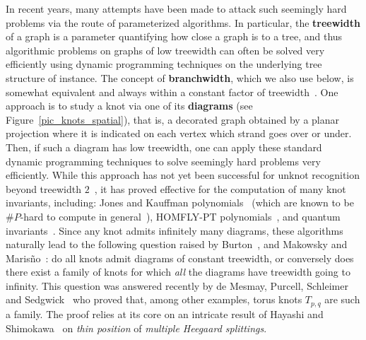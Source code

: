 \documentclass[11pt,a4paper]{article}
\begin{document}
In recent years, many attempts have been made to attack such seemingly hard problems via the route of parameterized algorithms. In particular, the \textbf{treewidth} of a graph is a parameter quantifying how close a graph is to a tree, and thus algorithmic problems on graphs of low treewidth can often be solved very efficiently using dynamic programming techniques on the underlying tree structure of instance. The concept of \textbf{branchwidth}, which we also use below, is somewhat equivalent and always within a constant factor of treewidth~\cite{Graph_Minors_X}. One approach is to study a knot via one of its \textbf{diagrams} (see Figure~\ref{pic_knots_spatial}), that is, a decorated graph obtained by a planar projection where it is indicated on each vertex which strand goes over or under. Then, if such a diagram has low treewidth, one can apply these standard dynamic programming techniques to solve seemingly hard problems very efficiently. While this approach has not yet been successful for unknot recognition beyond treewidth $2$~\cite{Bodlaender_Treewidth_2}, it has proved effective for the computation of many knot invariants, including: Jones and Kauffman polynomials~\cite{Malowsky_Jones} (which are known to be $\#P$-hard to compute in general~\cite{Jaeger}), HOMFLY-PT polynomials~\cite{Burton_Homfly}, and quantum invariants~\cite{maria,Burton_2018}. Since any knot admits infinitely many diagrams, these algorithms naturally lead to the following question raised by Burton~\cite[p.2694]{burton}, and Makowsky and Maris\~{n}o~\cite[p.755]{Malowsky_Jones}: do all knots admit diagrams of constant treewidth, or conversely does there exist a family of knots for which \textit{all} the diagrams have treewidth going to infinity. This question was answered recently by de Mesmay, Purcell, Schleimer and Sedgwick~\cite{Mesmay_treewidth} who proved that, among other examples, torus knots $T_{p,q}$ are such a family. The proof relies at its core on an intricate result of Hayashi and Shimokawa~\cite{Hayashi_spliting} on \emph{thin position} of \emph{multiple Heegaard splittings}.
\end{document}
